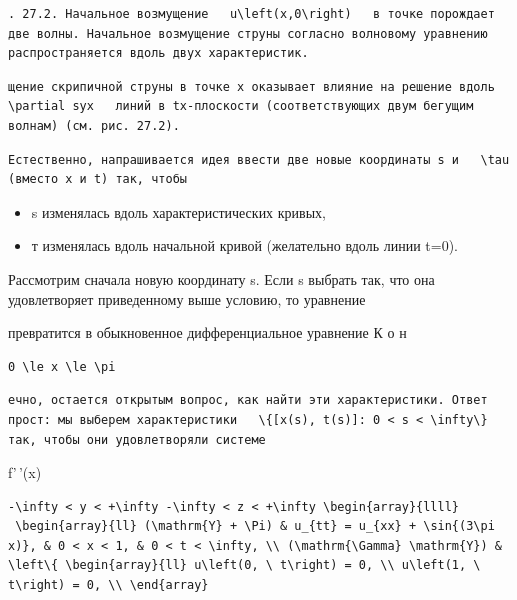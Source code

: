\documentclass[
  ukrainian,
]{article}
\begin{document}
\begin{verbatim}
. 27.2. Начальное возмущение   u\left(x,0\right)   в точке порождает две волны. Начальное возмущение струны согласно волновому уравнению распространяется вдоль двух характеристик.
\end{verbatim}

\begin{verbatim}
щение скрипичной струны в точке x оказывает влияние на решение вдоль   \partial syx   линий в tx-плоскости (соответствующих двум бегущим волнам) (см. рис. 27.2).
\end{verbatim}

\begin{verbatim}
Естественно, напрашивается идея ввести две новые координаты s и   \tau   (вместо x и t) так, чтобы
\end{verbatim}

\begin{itemize}
\item
  s изменялась вдоль характеристических кривых,
\item
  т изменялась вдоль начальной кривой (желательно вдоль линии t=0).
\end{itemize}

Рассмотрим сначала новую координату s. Если s выбрать так, что она
удовлетворяет приведенному выше условию, то уравнение

превратится в обыкновенное дифференциальное уравнение К о н

\begin{verbatim}
0 \le x \le \pi
\end{verbatim}

\begin{verbatim}
ечно, остается открытым вопрос, как найти эти характеристики. Ответ прост: мы выберем характеристики   \{[x(s), t(s)]: 0 < s < \infty\}   так, чтобы они удовлетворяли системе
\end{verbatim}

f'\,'(x)

\begin{verbatim}
-\infty < y < +\infty -\infty < z < +\infty \begin{array}{llll}
 \begin{array}{ll} (\mathrm{Y} + \Pi) & u_{tt} = u_{xx} + \sin{(3\pi x)}, & 0 < x < 1, & 0 < t < \infty, \\ (\mathrm{\Gamma} \mathrm{Y}) & \left\{ \begin{array}{ll} u\left(0, \ t\right) = 0, \\ u\left(1, \ t\right) = 0, \\ \end{array}
\end{verbatim}
\end{document}
